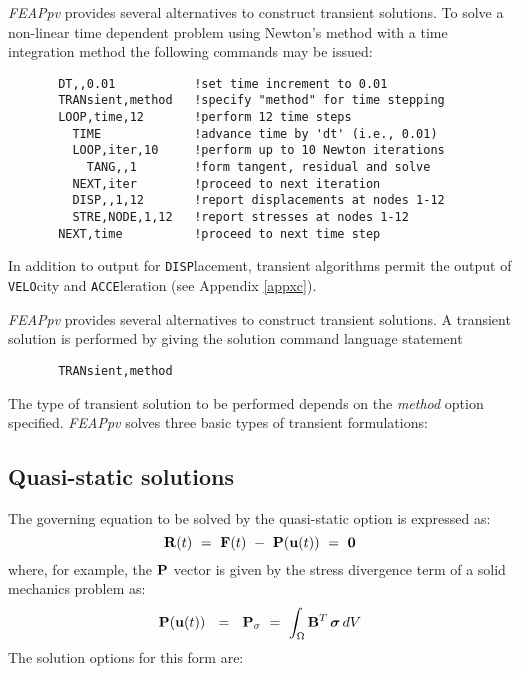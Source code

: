 {\sl FEAPpv} provides several alternatives to construct transient solutions.
To solve a non-linear time dependent problem
using Newton's method with a time integration method
the following commands may be issued:
\begin{verbatim}
       DT,,0.01           !set time increment to 0.01
       TRANsient,method   !specify "method" for time stepping
       LOOP,time,12       !perform 12 time steps
         TIME             !advance time by 'dt' (i.e., 0.01)
         LOOP,iter,10     !perform up to 10 Newton iterations
           TANG,,1        !form tangent, residual and solve
         NEXT,iter        !proceed to next iteration
         DISP,,1,12       !report displacements at nodes 1-12
         STRE,NODE,1,12   !report stresses at nodes 1-12
       NEXT,time          !proceed to next time step
\end{verbatim}
In addition to output for {\tt DISP}lacement, transient algorithms permit
the output of {\tt VELO}\-city and {\tt ACCE}l\-er\-a\-tion (see Appendix \ref{appxc}).

{\sl FEAPpv} provides several alternatives to construct transient solutions.
A transient solution is performed by giving the solution command language
statement
\begin{verbatim}
       TRANsient,method
\end{verbatim}
The type of transient solution to be performed
depends on the {\it method} option specified.
{\sl FEAPpv} solves three basic types of transient formulations:

\subsection{Quasi-static solutions}
\label{static}

The governing equation to be solved by the quasi-static option is expressed
as:
\begin{equation}
\mathbf{R} (t) ~=~ \mathbf{F}(t) ~-~ \mathbf{P}( \mathbf{u}(t) ) ~=~ {\bf 0}
\end{equation}
where, for example, the $\mathbf{P}$ vector is given by the stress divergence
term of a solid mechanics problem as:
\begin{equation}
\mathbf{P}( \mathbf{u}(t) ) ~~=~~ \mathbf{P}_{\sigma} ~=~
\int_{\Omega} \mathbf{B}^T \, \boldsymbol{\sigma} \, dV
\end{equation}
The solution options for this form are:

